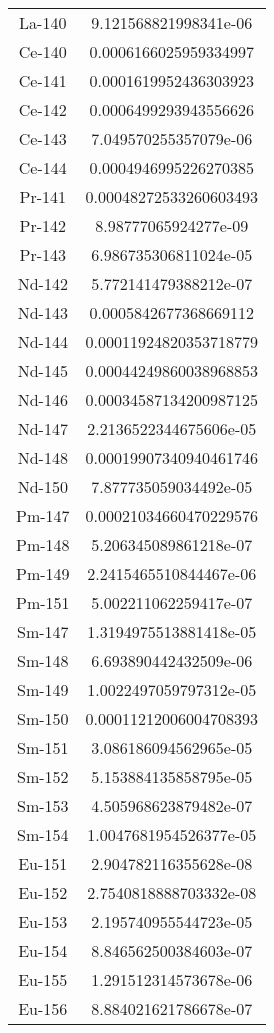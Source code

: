\begin{table}[h!]
\begin{tabular}{|| c || c |}
La-140 &  9.121568821998341e-06 \\
Ce-140 &  0.0006166025959334997 \\
Ce-141 &  0.0001619952436303923 \\
Ce-142 &  0.0006499293943556626 \\
Ce-143 &  7.049570255357079e-06 \\
Ce-144 &  0.0004946995226270385 \\
Pr-141 &  0.00048272533260603493 \\
Pr-142 &  8.98777065924277e-09 \\
Pr-143 &  6.986735306811024e-05 \\
Nd-142 &  5.772141479388212e-07 \\
Nd-143 &  0.0005842677368669112 \\
Nd-144 &  0.00011924820353718779 \\
Nd-145 &  0.00044249860038968853 \\
Nd-146 &  0.00034587134200987125 \\
Nd-147 &  2.2136522344675606e-05 \\
Nd-148 &  0.00019907340940461746 \\
Nd-150 &  7.877735059034492e-05 \\
Pm-147 &  0.00021034660470229576 \\
Pm-148 &  5.206345089861218e-07 \\
Pm-149 &  2.2415465510844467e-06 \\
Pm-151 &  5.002211062259417e-07 \\
Sm-147 &  1.3194975513881418e-05 \\
Sm-148 &  6.693890442432509e-06 \\
Sm-149 &  1.0022497059797312e-05 \\
Sm-150 &  0.00011212006004708393 \\
Sm-151 &  3.086186094562965e-05 \\
Sm-152 &  5.153884135858795e-05 \\
Sm-153 &  4.505968623879482e-07 \\
Sm-154 &  1.0047681954526377e-05 \\
Eu-151 &  2.904782116355628e-08 \\
Eu-152 &  2.7540818888703332e-08 \\
Eu-153 &  2.195740955544723e-05 \\
Eu-154 &  8.846562500384603e-07 \\
Eu-155 &  1.291512314573678e-06 \\
Eu-156 &  8.884021621786678e-07 \\

\end{tabular}
\end{table}
